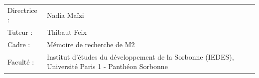 \begin{titlepage}
\begin{center}
\begin{center}
\end{center}


\bigskip

\bigskip

\begin{tabular}{lp{10cm}}
    Directrice : & Nadia Maïzi \\
    Tuteur : &  Thibaut Feix\\
    Cadre : & Mémoire de recherche de M2 \\
    Faculté : & Institut d'études du développement de la Sorbonne (IEDES), Université Paris 1 - Panthéon Sorbonne
\end{tabular}

\bigskip
\bigskip

\begin{tabular}{p{15mm}p{10cm}}
\end{tabular}

\end{center}




\end{titlepage}
